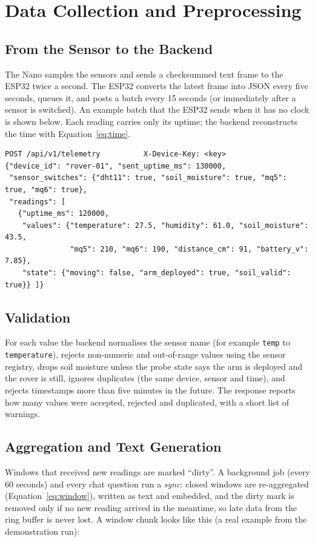 \section{Data Collection and Preprocessing}

\subsection{From the Sensor to the Backend}

The Nano samples the sensors and sends a checksummed text frame to the ESP32 twice a second. The ESP32 converts the latest frame into
JSON every five seconds, queues it, and posts a batch every 15 seconds (or immediately after a sensor is switched). An example batch
that the ESP32 sends when it has no clock is shown below. Each reading carries only its uptime; the backend reconstructs the time with
Equation~\ref{eq:time}.

\begin{lstlisting}
POST /api/v1/telemetry          X-Device-Key: <key>
{"device_id": "rover-01", "sent_uptime_ms": 130000,
 "sensor_switches": {"dht11": true, "soil_moisture": true, "mq5": true, "mq6": true},
 "readings": [
   {"uptime_ms": 120000,
    "values": {"temperature": 27.5, "humidity": 61.0, "soil_moisture": 43.5,
               "mq5": 210, "mq6": 190, "distance_cm": 91, "battery_v": 7.85},
    "state": {"moving": false, "arm_deployed": true, "soil_valid": true}} ]}
\end{lstlisting}

\subsection{Validation}

For each value the backend normalises the sensor name (for example \texttt{temp} to \texttt{temperature}), rejects non-numeric and
out-of-range values using the sensor registry, drops soil moisture unless the probe state says the arm is deployed and the rover
is still, ignores duplicates (the same device, sensor and time), and rejects timestamps more than five minutes in the future.
The response reports how many values were accepted, rejected and duplicated, with a short list of warnings.

\subsection{Aggregation and Text Generation}

Windows that received new readings are marked ``dirty''. A background job (every 60 seconds) and every chat question run a
\emph{sync}: closed windows are re-aggregated (Equation~\ref{eq:window}), written as text and embedded, and the dirty mark is removed only if no
new reading arrived in the meantime, so late data from the ring buffer is never lost. A window chunk looks like this (a real example
from the demonstration run):

